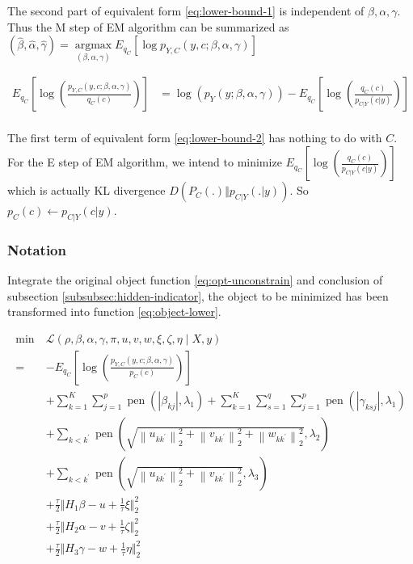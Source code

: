 \documentclass[12pt, a4paper, oneside]{article}
\numberwithin{equation}{section}
\begin{document}
The second part of equivalent form \ref{eq:lower-bound-1} is independent of $\beta, \alpha, \gamma$. Thus the M step of EM algorithm can be summarized as $(\hat\beta, \hat\alpha, \hat\gamma) = \mathop{\arg\max}\limits_{(\beta, \alpha, \gamma)}{E_{q_C}\left[\log{p_{Y, C}(y, c; \beta, \alpha, \gamma)}\right]}$

\begin{equation}
	\label{eq:lower-bound-2}
	\begin{aligned}
		E_{q_C}\left[\log{\left(\frac{p_{Y, C}(y, c; \beta, \alpha, \gamma)}{q_C(c)}\right)}\right]
		&=\log{\left(p_{Y}(y; \beta, \alpha, \gamma)\right)} - E_{q_C}\left[\log\left(\frac{q_C(c)}{p_{C|Y}(c|y)}\right)\right] \\
	\end{aligned}
\end{equation}

The first term of equivalent form \ref{eq:lower-bound-2} has nothing to do with $C$. For the E step of EM algorithm, we intend to minimize $E_{q_C}\left[\log\left(\frac{q_C(c)}{p_{C|Y}(c|y)}\right)\right]$ which is actually KL divergence $D\left(P_C(.)\Vert p_{C|Y}(.|y)\right)$. So $p_C(c) \leftarrow p_{C|Y}(c|y)$.

\subsubsection{Notation}

Integrate the original object function \ref{eq:opt-unconstrain} and conclusion of subsection \ref{subsubsec:hidden-indicator}, the object to be minimized has been transformed into function \ref{eq:object-lower}.
	
\begin{equation}
\label{eq:object-lower}
\begin{aligned}
	\operatorname{min}\ &\mathcal{L}(\rho, \beta, \alpha, \gamma, \pi, u, v, w, \xi, \zeta, \eta \mid X, y) \\
	=&-E_{q_C}\left[\log{\left(\frac{p_{Y, C}(y, c; \beta, \alpha, \gamma)}{p_C(c)}\right)}\right] \\
	&+\sum_{k=1}^{K} \sum_{j=1}^{p} \operatorname{pen}\left(\left|\beta_{kj}\right|, \lambda_{1}\right)+\sum_{k=1}^{K} \sum_{s=1}^{q} \sum_{j=1}^{p} \operatorname{pen}\left(\left|\gamma_{ksj}\right|, \lambda_{1}\right) \\
	&+\sum_{k<k^{\prime}} \operatorname{pen}\left(\sqrt{\left\|u_{k{k^\prime}}\right\|_{2}^{2}+\left\|v_{k{k^\prime}}\right\|_{2}^{2}+\left\|w_{k{k^\prime}}\right\|_{2}^{2}}, \lambda_{2}\right) \\
	&+\sum_{k<k^{\prime}} \operatorname{pen}\left(\sqrt{\left\|u_{k{k^\prime}}\right\|_{2}^{2}+\left\|v_{k{k^\prime}}\right\|_{2}^{2}}, \lambda_{3}\right) \\ 
	&+\frac{\tau}{2}\Vert H_1\beta - u + \frac{1}{\tau}\xi\Vert_2^2  \\
	&+\frac{\tau}{2}\Vert H_2\alpha - v + \frac{1}{\tau}\zeta\Vert_2^2  \\
	&+\frac{\tau}{2}\Vert H_3\gamma - w + \frac{1}{\tau}\eta\Vert_2^2 
\end{aligned}
\end{equation}
\end{document}
